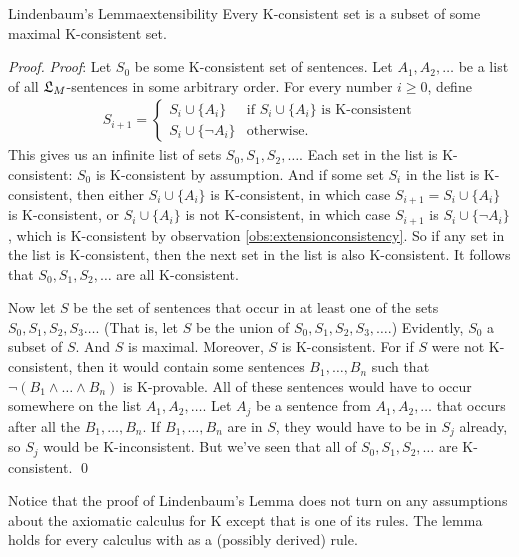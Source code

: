 \begin{theorem}{Lindenbaum's Lemma}{extensibility}
  Every K-consistent set is a subset of some maximal K-consistent set.
\end{theorem}
%
\begin{proof}
  \emph{Proof}: Let $S_0$ be some K-consistent set of sentences. Let
  $A_1,A_2,\ldots$ be a list of all $\mathfrak{L}_M$-sentences in some arbitrary
  order. For every number $i\geq 0$, define
  \begin{gather*}
    S_{i+1} = \begin{cases} S_i \cup \{ A_i \} & \text{if $S_i \cup \{ A_i \}$ is K-consistent}\\
      S_i \cup \{ \neg A_i \} & \text{otherwise}.
    \end{cases}
  \end{gather*}
%
  This gives us an infinite list of sets $S_0,S_1,S_2,\ldots$. Each set in the
  list is K-consistent: $S_0$ is K-consistent by assumption. And if some set
  $S_i$ in the list is K-consistent, then either $S_i \cup \{ A_i \}$ is
  K-consistent, in which case $S_{i+1} = S_i \cup \{ A_i \}$ is K-consistent, or
  $S_i \cup \{ A_i \}$ is not K-consistent, in which case $S_{i+1}$ is
  $S_i \cup \{ \neg A_i \}$, which is K-consistent by observation
  \ref{obs:extensionconsistency}. So if any set in the list is K-consistent, then
  the next set in the list is also K-consistent. It follows that
  $S_0,S_1,S_2,\ldots$ are all K-consistent.

  Now let $S$ be the set of sentences that occur in at least one of the sets
  $S_{0},S_1, S_2,S_3\ldots$. (That is, let $S$ be the union of
  $S_{0},S_1,S_2,S_3,\ldots$.) Evidently, $S_0$ a subset of $S$. And $S$ is
  maximal. Moreover, $S$ is K-consistent. For if $S$ were not K-consistent, then
  it would contain some sentences $B_1,\ldots,B_n$ such that
  $\neg (B_1\land \ldots\land B_n)$ is K-provable. All of these sentences would
  have to occur somewhere on the list $A_1,A_2,\ldots$. Let $A_j$ be a sentence
  from $A_1,A_2,\ldots$ that occurs after all the $B_1,\ldots,B_n$. If
  $B_1,\ldots,B_n$ are in $S$, they would have to be in $S_j$ already, so $S_j$
  would be K-inconsistent. But we've seen that all of $S_0,S_1,S_2,\ldots$ are
  K-consistent. \qed
\end{proof}

Notice that the proof of Lindenbaum's Lemma does not turn on any assumptions
about the axiomatic calculus for K except that  is one of its rules. The
lemma holds for every calculus with  as a (possibly derived) rule.

